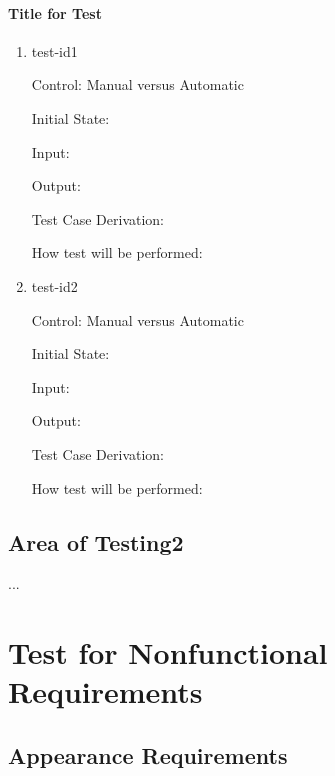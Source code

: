 \documentclass[12pt, titlepage]{article}
\begin{document}
\paragraph{Title for Test}

\begin{enumerate}

\item{test-id1\\}

Control: Manual versus Automatic
					
Initial State: 
					
Input: 
					
Output: 

Test Case Derivation: 
					
How test will be performed: 
					
\item{test-id2\\}

Control: Manual versus Automatic
					
Initial State: 
					
Input: 
					
Output: 

Test Case Derivation: 

How test will be performed: 

\end{enumerate}

\subsection{Area of Testing2}

...

\setlength\parindent{0pt}
\maketitle

\section{Test for Nonfunctional Requirements  }

\subsection{Appearance Requirements }
\end{document}
